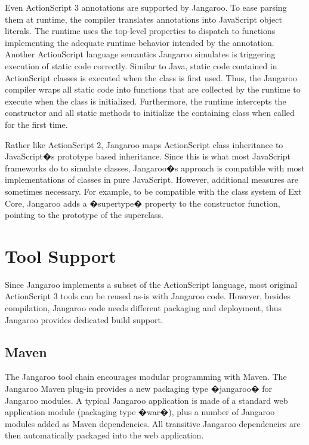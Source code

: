 \documentclass[10pt]{sigplanconf}
\begin{document}
Even ActionScript 3 annotations are supported by Jangaroo. To ease parsing them at runtime, the compiler translates annotations into JavaScript object literals. The runtime uses the top-level properties to dispatch to functions implementing the adequate runtime behavior intended by the annotation. Another ActionScript language semantics Jangaroo simulates is triggering execution of static code correctly. Similar to Java, static code contained in ActionScript classes is executed when the class is first used. Thus, the Jangaroo compiler wraps all static code into functions that are collected by the runtime to execute when the class is initialized. Furthermore, the runtime intercepts the constructor and all static methods to initialize the containing class when called for the first time.

Rather like ActionScript 2, Jangaroo maps ActionScript class inheritance to JavaScript�s prototype based inheritance. Since this is what most JavaScript frameworks do to simulate classes, Jangaroo�s approach is compatible with most implementations of classes in pure JavaScript. However, additional measures are sometimes necessary. For example, to be compatible with the class system of Ext Core\citep{ext-core}, Jangaroo adds a �supertype� property to the constructor function, pointing to the prototype of the superclass.

\section{Tool Support}

Since Jangaroo implements a subset of the ActionScript language, most original ActionScript 3 tools can be reused as-is with Jangaroo code. However, besides compilation, Jangaroo code needs different packaging and deployment, thus Jangaroo provides dedicated build support.

\subsection{Maven}

The Jangaroo tool chain encourages modular programming with Maven\citep{maven}. The Jangaroo Maven plug-in provides a new packaging type �jangaroo� for Jangaroo modules. A typical Jangaroo application is made of a standard web application module (packaging type �war�), plus a number of Jangaroo modules added as Maven dependencies. All transitive Jangaroo dependencies are then automatically packaged into the web application. 
\end{document}
